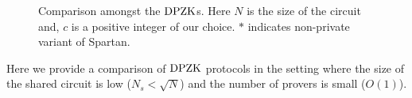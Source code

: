 \begin{figure}[h!]
	\centering
	\caption{\footnotesize Comparison amongst the $\text{DPZK}$s. Here $N$ is the size of the circuit and, $c$ is a positive integer of our choice. $\ast$ indicates non-private variant of Spartan.}\label{tab:DPZKwSmallN}
\end{figure}

Here we provide a comparison of $\text{DPZK}$ protocols in the setting where the size of the shared circuit is low ($N_s < \sqrt{N}$) and the number of provers is small ($O(1)$). 